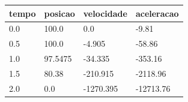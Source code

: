 \begin{tabular}{llll}
\toprule
tempo & posicao & velocidade & aceleracao \\
\midrule
0.0 & 100.0 & 0.0 & -9.81 \\
0.5 & 100.0 & -4.905 & -58.86 \\
1.0 & 97.5475 & -34.335 & -353.16 \\
1.5 & 80.38 & -210.915 & -2118.96 \\
2.0 & 0.0 & -1270.395 & -12713.76 \\
\bottomrule
\end{tabular}
